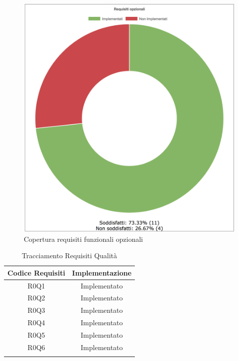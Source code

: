 \begin{figure}[H]
	\centering
	\includegraphics[scale = 0.6]{Images/opzionali.png}
	\caption{Copertura requisiti funzionali opzionali}
	\label{img:seqGraph}
\end{figure}

\begin{longtable}{|c|c|}
	\hline
	\textbf{Codice Requisiti} & \textbf{Implementazione} \\
	\hline
	\endhead
	R0Q1 & Implementato\\
	\hline
	R0Q2 & Implementato\\
	\hline
	R0Q3 & Implementato\\
	\hline
	R0Q4 & Implementato\\
	\hline
	R0Q5 & Implementato\\
	\hline
	R0Q6 & Implementato\\
	\hline
	\caption[Tracciamento Requisiti Qualità]{Tracciamento Requisiti Qualità}
\end{longtable}

